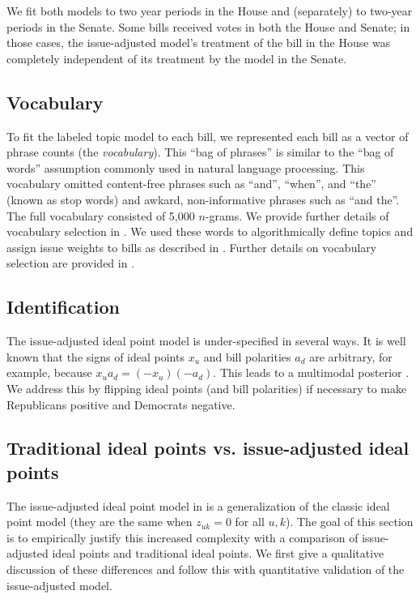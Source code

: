 We fit both models to two year periods in the House and (separately)
to two-year periods in the Senate.  Some bills received votes in both
the House and Senate; in those cases, the issue-adjusted model's
treatment of the bill in the House was completely independent of its
treatment by the model in the Senate.

\subsection{Vocabulary}
To fit the labeled topic model to each bill, we represented each bill
as a vector of phrase counts (the \emph{vocabulary}).  This ``bag of
phrases'' is similar to the ``bag of words'' assumption commonly used
in natural language processing.  This vocabulary omitted content-free
phrases such as ``and'', ``when'', and ``the'' (known as stop words)
and awkard, non-informative phrases such as ``and the''.  The full
vocabulary consisted of 5,000 $n$-grams. We provide further details of
vocabulary selection in .  We used these
words to algorithmically define topics and assign issue weights to
bills as described in .  Further details on vocabulary
selection are provided in .

\subsection{Identification}
The issue-adjusted ideal point model is under-specified in
several ways.  It is well known that the signs of ideal points $x_u$
and bill polarities $a_d$ are arbitrary, for example, because $x_u a_d
= (-x_u)(-a_d)$. This leads to a multimodal posterior
\citep{jackman:2001}.  We address this by flipping ideal points (and
bill polarities) if necessary to make Republicans positive and
Democrats negative.

\subsection{Traditional ideal points vs. issue-adjusted ideal points}

\label{sec:jackman_vs_exploratory}
The issue-adjusted ideal point model in
 is a generalization of the
classic ideal point model (they are the same when $z_{uk}=0$ for all
$u,k$). The goal of this section is to empirically justify this
increased complexity with a comparison of issue-adjusted ideal points
and traditional ideal points.  We first give a qualitative discussion
of these differences and follow this with quantitative validation of
the issue-adjusted model.

